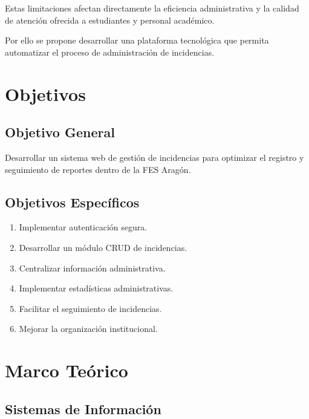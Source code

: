 \documentclass[12pt,letterpaper,oneside]{extreport}
\begin{document}
Estas limitaciones afectan directamente la eficiencia administrativa y la calidad de atención ofrecida a estudiantes y personal académico.

Por ello se propone desarrollar una plataforma tecnológica que permita automatizar el proceso de administración de incidencias.

\chapter{Objetivos}

\section{Objetivo General}

Desarrollar un sistema web de gestión de incidencias para optimizar el registro y seguimiento de reportes dentro de la FES Aragón.

\section{Objetivos Específicos}

\begin{enumerate}
    \item Implementar autenticación segura.
    
    \item Desarrollar un módulo CRUD de incidencias.
    
    \item Centralizar información administrativa.
    
    \item Implementar estadísticas administrativas.
    
    \item Facilitar el seguimiento de incidencias.
    
    \item Mejorar la organización institucional.
\end{enumerate}

\chapter{Marco Teórico}

\section{Sistemas de Información}
\end{document}
